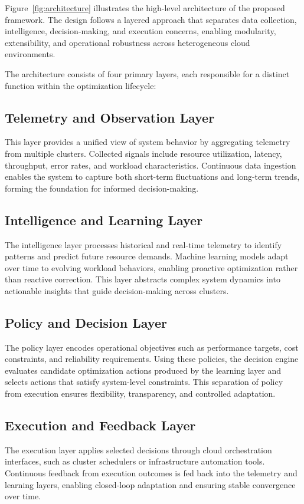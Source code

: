 \documentclass[conference]{IEEEtran}
\begin{document}
Figure~\ref{fig:architecture} illustrates the high-level architecture of the proposed framework. The design follows a layered approach that separates data collection, intelligence, decision-making, and execution concerns, enabling modularity, extensibility, and operational robustness across heterogeneous cloud environments.

The architecture consists of four primary layers, each responsible for a distinct function within the optimization lifecycle:

\subsection{Telemetry and Observation Layer}
This layer provides a unified view of system behavior by aggregating telemetry from multiple clusters. Collected signals include resource utilization, latency, throughput, error rates, and workload characteristics. Continuous data ingestion enables the system to capture both short-term fluctuations and long-term trends, forming the foundation for informed decision-making.

\subsection{Intelligence and Learning Layer}
The intelligence layer processes historical and real-time telemetry to identify patterns and predict future resource demands. Machine learning models adapt over time to evolving workload behaviors, enabling proactive optimization rather than reactive correction. This layer abstracts complex system dynamics into actionable insights that guide decision-making across clusters.

\subsection{Policy and Decision Layer}
The policy layer encodes operational objectives such as performance targets, cost constraints, and reliability requirements. Using these policies, the decision engine evaluates candidate optimization actions produced by the learning layer and selects actions that satisfy system-level constraints. This separation of policy from execution ensures flexibility, transparency, and controlled adaptation.

\subsection{Execution and Feedback Layer}
The execution layer applies selected decisions through cloud orchestration interfaces, such as cluster schedulers or infrastructure automation tools. Continuous feedback from execution outcomes is fed back into the telemetry and learning layers, enabling closed-loop adaptation and ensuring stable convergence over time.
\end{document}
